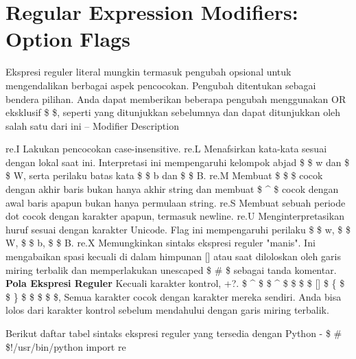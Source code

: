 \section{Regular Expression Modifiers: Option Flags}
Ekspresi reguler literal mungkin termasuk pengubah opsional untuk mengendalikan berbagai aspek pencocokan. Pengubah ditentukan sebagai bendera pilihan. Anda dapat memberikan beberapa pengubah menggunakan OR eksklusif {\$  \vert  \$}, seperti yang ditunjukkan sebelumnya dan dapat ditunjukkan oleh salah satu dari ini – Modifier Description  \par
re.I \hspace*{0.5in}  
Lakukan pencocokan case-insensitive. 
re.L \hspace*{0.5in}  
Menafsirkan kata-kata sesuai dengan lokal saat ini. Interpretasi ini mempengaruhi kelompok abjad {\$  \setminus \$ w dan  \$  \setminus  \$ W}, serta perilaku batas kata {\$  \setminus  \$ b dan  \$  \setminus  \$ B}. 
re.M \hspace*{0.5in}  
Membuat  \$  \$  \$ cocok dengan akhir baris {bukan hanya akhir string} dan membuat  {\$  \string^  \$} cocok dengan awal baris apapun {bukan hanya permulaan string}. 
re.S \hspace*{0.5in}  
\noindent 
Membuat sebuah periode {dot} cocok dengan karakter apapun, termasuk newline. 
re.U \hspace*{0.5in}  
Menginterpretasikan huruf sesuai dengan karakter Unicode. Flag ini mempengaruhi perilaku  \$  \setminus  \$ w,  \$  \setminus  \$ W,  \$  \setminus  \$ b,  \$  \setminus  \$ B. 
re.X \hspace*{0.5in}   
Memungkinkan sintaks ekspresi reguler "manis". Ini mengabaikan spasi {kecuali di dalam himpunan [] atau saat diloloskan oleh garis miring terbalik} dan memperlakukan unescaped  \$  \#  \$ sebagai tanda komentar. 
\textbf{Pola Ekspresi Reguler}  
Kecuali karakter kontrol, {+?.  \$  \string^  \$  \$  \string^  \$  \$  \$  \$ {} []  \$  \{  \$ \$  \}  \$  \$  \vert  \$  \$  \setminus  \$}, Semua karakter cocok dengan karakter mereka sendiri. Anda bisa lolos dari karakter kontrol sebelum mendahului dengan garis miring terbalik. \par
\noindent 
Berikut daftar tabel sintaks ekspresi reguler yang tersedia dengan Python - 
 \$  \#  \$!/usr/bin/python 
import re \par
